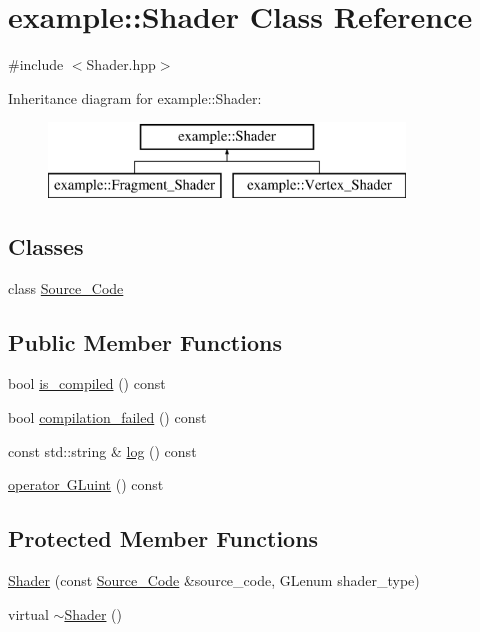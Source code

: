 \hypertarget{classexample_1_1_shader}{}\section{example\+:\+:Shader Class Reference}
\label{classexample_1_1_shader}


{\ttfamily \#include $<$Shader.\+hpp$>$}

Inheritance diagram for example\+:\+:Shader\+:\begin{figure}[H]
\begin{center}
\leavevmode
\includegraphics[height=2.000000cm]{classexample_1_1_shader}
\end{center}
\end{figure}
\subsection*{Classes}
\begin{DoxyCompactItemize}
\item 
class \mbox{\hyperlink{classexample_1_1_shader_1_1_source___code}{Source\+\_\+\+Code}}
\end{DoxyCompactItemize}
\subsection*{Public Member Functions}
\begin{DoxyCompactItemize}
\item 
bool \mbox{\hyperlink{classexample_1_1_shader_abd0acb5a26b8829d6e81908b487fa329}{is\+\_\+compiled}} () const
\item 
bool \mbox{\hyperlink{classexample_1_1_shader_ae2203671e91aa91ae726e9c3b1894077}{compilation\+\_\+failed}} () const
\item 
const std\+::string \& \mbox{\hyperlink{classexample_1_1_shader_a4d5153ab0443d4747e076ad9e6d88d1c}{log}} () const
\item 
\mbox{\hyperlink{classexample_1_1_shader_aa2639e785a366ebe1837e550833150e8}{operator G\+Luint}} () const
\end{DoxyCompactItemize}
\subsection*{Protected Member Functions}
\begin{DoxyCompactItemize}
\item 
\mbox{\hyperlink{classexample_1_1_shader_a59b388f5122bdacd19a92b1ff71bcf97}{Shader}} (const \mbox{\hyperlink{classexample_1_1_shader_1_1_source___code}{Source\+\_\+\+Code}} \&source\+\_\+code, G\+Lenum shader\+\_\+type)
\item 
virtual \mbox{\hyperlink{classexample_1_1_shader_adffb3500548af9fc8d4a2d00db6ad465}{$\sim$\+Shader}} ()
\end{DoxyCompactItemize}



